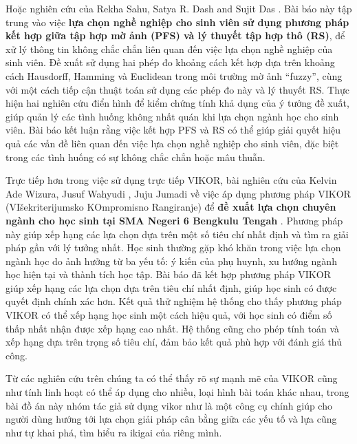 Hoặc nghiên cứu của Rekha Sahu, Satya R. Dash and Sujit Das \cite{rekha}. Bài báo này tập trung vào việc \textbf{lựa chọn nghề nghiệp cho sinh viên sử dụng phương pháp kết hợp giữa tập hợp mờ ảnh (PFS) và lý thuyết tập hợp thô (RS)}, để xử lý thông tin không chắc chắn liên quan đến việc lựa chọn nghề nghiệp của sinh viên. Đề xuất sử dụng hai phép đo khoảng cách kết hợp dựa trên khoảng cách Hausdorff, Hamming và Euclidean trong môi trường mờ ảnh “fuzzy”, cùng với một cách tiếp cận thuật toán sử dụng các phép đo này và lý thuyết RS. Thực hiện hai nghiên cứu điển hình để kiểm chứng tính khả dụng của ý tưởng đề xuất, giúp quản lý các tình huống không nhất quán khi lựa chọn ngành học cho sinh viên. Bài báo kết luận rằng việc kết hợp PFS và RS có thể giúp giải quyết hiệu quả các vấn đề liên quan đến việc lựa chọn nghề nghiệp cho sinh viên, đặc biệt trong các tình huống có sự không chắc chắn hoặc mâu thuẫn.

Trực tiếp hơn trong việc sử dụng trực tiếp VIKOR, bài nghiên cứu của Kelvin Ade Wizura, Jusuf Wahyudi , Juju Jumadi về việc áp dụng phương pháp VIKOR (VIšekriterijumsko KOmpromisno Rangiranje) để \textbf{đề xuất lựa chọn chuyên ngành cho học sinh tại SMA Negeri 6 Bengkulu Tengah} \cite{kelvin}. Phương pháp này giúp xếp hạng các lựa chọn dựa trên một số tiêu chí nhất định và tìm ra giải pháp gần với lý tưởng nhất. Học sinh thường gặp khó khăn trong việc lựa chọn ngành học do ảnh hưởng từ ba yếu tố: ý kiến của phụ huynh, xu hướng ngành học hiện tại và thành tích học tập. Bài báo đã kết hợp phương pháp VIKOR giúp xếp hạng các lựa chọn dựa trên tiêu chí nhất định, giúp học sinh có được quyết định chính xác hơn. Kết quả thử nghiệm hệ thống cho thấy phương pháp VIKOR có thể xếp hạng học sinh một cách hiệu quả, với học sinh có điểm số thấp nhất nhận được xếp hạng cao nhất. Hệ thống cũng cho phép tính toán và xếp hạng dựa trên trọng số tiêu chí, đảm bảo kết quả phù hợp với đánh giá thủ công.

Từ các nghiên cứu trên chúng ta có thể thấy rõ sự mạnh mẽ của VIKOR cũng như tính linh hoạt có thể áp dụng cho nhiều, loại hình bài toán khác nhau, trong bài đồ án này nhóm tác giả sử dụng vikor như là một công cụ chính giúp cho người dùng hướng tới lựa chọn giải pháp cân bằng giữa các yếu tố và lựa cũng như tự khai phá, tìm hiểu ra ikigai của riêng mình.

